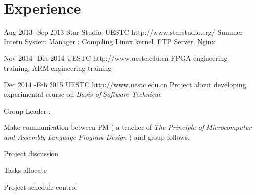 \documentclass[10pt]{article} %
\begin{document}
%
%
%
%
%
%
%
\section{Experience}
\job
{Aug 2013 -}{Sep 2013}
{Star Studio, UESTC}
{http://www.starstudio.org/}
{Summer Intern}
{System Manager : Compiling Linux kernel, FTP Server, Nginx}

\job
{Nov 2014 -}{Dec 2014}
{UESTC}
{http://www.uestc.edu.cn}
{FPGA engineering training, ARM engineering training}
{}

\job
{Dec 2014 -}{Feb 2015}
{UESTC}
{http://www.uestc.edu.cn}
{Project about developing experimental course on \textit {Basis of Software Technique}}
{Group Leader :
\begin{itemize-noindent}
	\item Make communication between PM ( a teacher of \textit {The Principle of Microcomputer and Assembly Language Program Design} ) and group follows.
	\item Project discussion
	\item Tasks allocate
	\item Project schedule control
\end{itemize-noindent}
}
\end{document}
